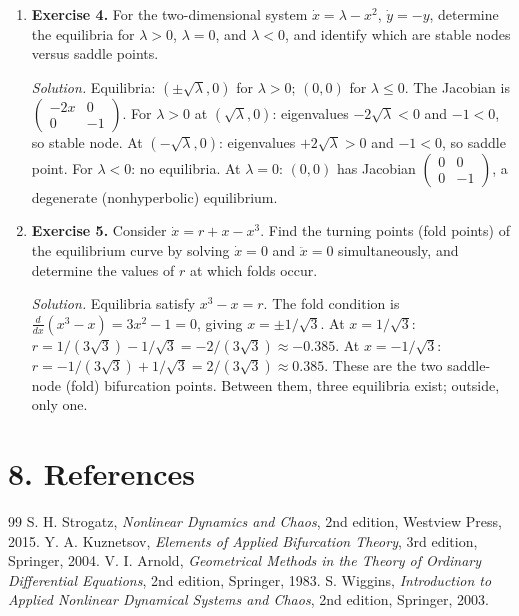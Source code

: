 \begin{enumerate}[leftmargin=*,itemsep=0.9em]
\item \textbf{Exercise 4.} For the two-dimensional system $\dot x=\lambda-x^2$, $\dot y=-y$, determine the equilibria for $\lambda>0$, $\lambda=0$, and $\lambda<0$, and identify which are stable nodes versus saddle points.

\emph{Solution.} Equilibria: $(\pm\sqrt{\lambda},0)$ for $\lambda>0$; $(0,0)$ for $\lambda\le 0$. The Jacobian is $\begin{pmatrix}-2x&0\\0&-1\end{pmatrix}$. For $\lambda>0$ at $(\sqrt{\lambda},0)$: eigenvalues $-2\sqrt{\lambda}<0$ and $-1<0$, so stable node. At $(-\sqrt{\lambda},0)$: eigenvalues $+2\sqrt{\lambda}>0$ and $-1<0$, so saddle point. For $\lambda<0$: no equilibria. At $\lambda=0$: $(0,0)$ has Jacobian $\begin{pmatrix}0&0\\0&-1\end{pmatrix}$, a degenerate (nonhyperbolic) equilibrium.

\item \textbf{Exercise 5.} Consider $\dot x=r+x-x^3$. Find the turning points (fold points) of the equilibrium curve by solving $\dot x=0$ and $\ddot x=0$ simultaneously, and determine the values of $r$ at which folds occur.

\emph{Solution.} Equilibria satisfy $x^3-x=r$. The fold condition is $\frac{d}{dx}(x^3-x)=3x^2-1=0$, giving $x=\pm 1/\sqrt{3}$. At $x=1/\sqrt{3}$: $r=1/(3\sqrt{3})-1/\sqrt{3}=-2/(3\sqrt{3})\approx -0.385$. At $x=-1/\sqrt{3}$: $r=-1/(3\sqrt{3})+1/\sqrt{3}=2/(3\sqrt{3})\approx 0.385$. These are the two saddle-node (fold) bifurcation points. Between them, three equilibria exist; outside, only one.

\end{enumerate}
\section*{8. References}
\begin{thebibliography}{99}
 S. H. Strogatz, \emph{Nonlinear Dynamics and Chaos}, 2nd edition, Westview Press, 2015.
 Y. A. Kuznetsov, \emph{Elements of Applied Bifurcation Theory}, 3rd edition, Springer, 2004.
 V. I. Arnold, \emph{Geometrical Methods in the Theory of Ordinary Differential Equations}, 2nd edition, Springer, 1983.
 S. Wiggins, \emph{Introduction to Applied Nonlinear Dynamical Systems and Chaos}, 2nd edition, Springer, 2003.
\end{thebibliography}
